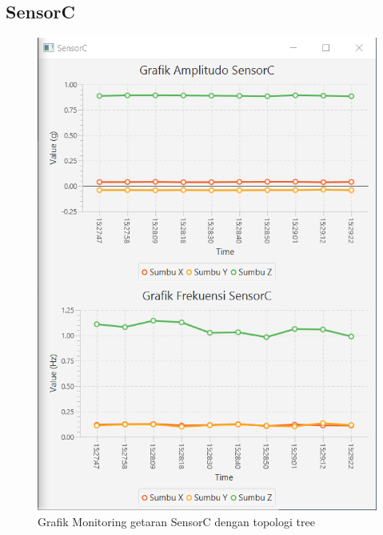 \subsection{SensorC}
\begin{figure}[H] 
	\centering  
	\includegraphics[scale=1]{Lampiran/HasilPengujian/sensorC_treeRooftop.PNG} 
	\caption[Grafik Monitoring getaran SensorC dengan topologi tree]{Grafik Monitoring getaran SensorC dengan topologi tree}
	\label{fig:grafik_C_tree_rooftop} 
\end{figure}

